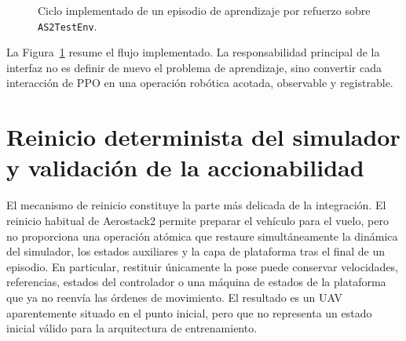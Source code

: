 \begin{figure}[t]
\centering
\shorthandoff{<>}
\shorthandon{<>}
\caption{Ciclo implementado de un episodio de aprendizaje por refuerzo sobre
\texttt{AS2TestEnv}.}
\label{fig:implementacion:ciclo_entorno}
\end{figure}

La Figura~\ref{fig:implementacion:ciclo_entorno} resume el flujo implementado.
La responsabilidad principal de la interfaz no es definir de nuevo el problema de
aprendizaje, sino convertir cada interacción de PPO en una operación robótica
acotada, observable y registrable.


\section{Reinicio determinista del simulador y validación de la accionabilidad}
\label{sct:implementacion:diagnostico_reset}

El mecanismo de reinicio constituye la parte más delicada de la integración. El
reinicio habitual de Aerostack2 permite preparar el vehículo para el vuelo, pero
no proporciona una operación atómica que restaure simultáneamente la dinámica
del simulador, los estados auxiliares y la capa de plataforma tras el final de
un episodio. En particular, restituir únicamente la pose puede conservar
velocidades, referencias, estados del controlador o una máquina de estados de
la plataforma que ya no reenvía las órdenes de movimiento. El resultado es un
UAV aparentemente situado en el punto inicial, pero que no representa un
estado inicial válido para la arquitectura de entrenamiento.

